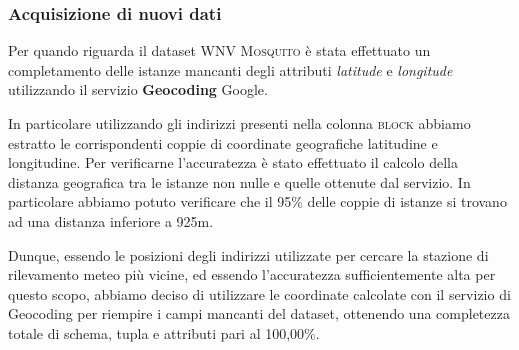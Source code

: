 \subsubsection{Acquisizione di nuovi dati}
Per quando riguarda il dataset \textsc{WNV Mosquito} è stata effettuato un completamento delle istanze mancanti degli attributi \textit{latitude} e \textit{longitude} utilizzando il servizio \textbf{Geocoding} Google.

In particolare utilizzando gli indirizzi presenti nella colonna \textsc{block} abbiamo estratto le corrispondenti coppie di coordinate geografiche latitudine e longitudine. 
Per verificarne l'accuratezza è stato effettuato il calcolo della distanza geografica tra le istanze non nulle e quelle ottenute dal servizio. In particolare abbiamo potuto verificare che il 95\% delle coppie di istanze si trovano ad una distanza inferiore a 925m.

Dunque, essendo le posizioni degli indirizzi utilizzate per cercare la stazione di rilevamento meteo più vicine, ed essendo l'accuratezza sufficientemente alta per questo scopo, abbiamo deciso di utilizzare le coordinate calcolate con il servizio di Geocoding per riempire i campi mancanti del dataset, ottenendo una completezza totale di schema, tupla e attributi pari al 100,00\%.
